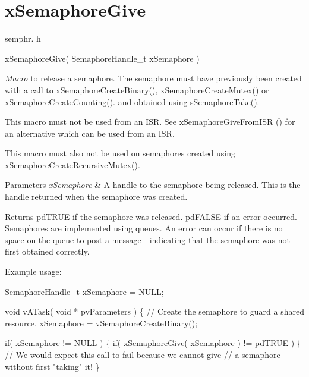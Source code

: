 \hypertarget{group__x_semaphore_give}{}\section{x\+Semaphore\+Give}
\label{group__x_semaphore_give}
semphr. h 
\begin{DoxyPre}xSemaphoreGive( SemaphoreHandle\_t xSemaphore )\end{DoxyPre}


{\itshape Macro} to release a semaphore. The semaphore must have previously been created with a call to x\+Semaphore\+Create\+Binary(), x\+Semaphore\+Create\+Mutex() or x\+Semaphore\+Create\+Counting(). and obtained using s\+Semaphore\+Take().

This macro must not be used from an I\+SR. See x\+Semaphore\+Give\+From\+I\+SR () for an alternative which can be used from an I\+SR.

This macro must also not be used on semaphores created using x\+Semaphore\+Create\+Recursive\+Mutex().


\begin{DoxyParams}{Parameters}
{\em x\+Semaphore} & A handle to the semaphore being released. This is the handle returned when the semaphore was created.\\
\hline
\end{DoxyParams}
\begin{DoxyReturn}{Returns}
pd\+T\+R\+UE if the semaphore was released. pd\+F\+A\+L\+SE if an error occurred. Semaphores are implemented using queues. An error can occur if there is no space on the queue to post a message -\/ indicating that the semaphore was not first obtained correctly.
\end{DoxyReturn}
Example usage\+: 
\begin{DoxyPre}
SemaphoreHandle\_t xSemaphore = NULL;\end{DoxyPre}



\begin{DoxyPre}void vATask( void * pvParameters )
\{
   // Create the semaphore to guard a shared resource.
   xSemaphore = vSemaphoreCreateBinary();\end{DoxyPre}



\begin{DoxyPre}   if( xSemaphore != NULL )
   \{
       if( xSemaphoreGive( xSemaphore ) != pdTRUE )
       \{
           // We would expect this call to fail because we cannot give
           // a semaphore without first "taking" it!
       \}\end{DoxyPre}



